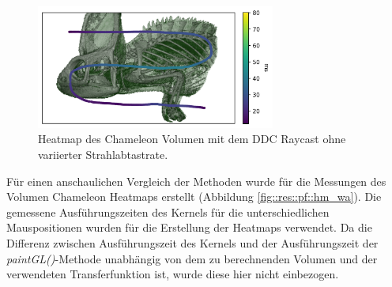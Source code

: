 \begin{figure}
	\centering
	\includegraphics[width=0.7\textwidth]{../../Neue_Messungen/Chameleon/heatmaps/ms_data_ddc_rORS_chameleon_heatmap.png}
	\caption{Heatmap des Chameleon Volumen mit dem DDC Raycast ohne variierter Strahlabtastrate.}
	\label{fig::res::pf::hm_ddc_ors}
\end{figure}
\fi

Für einen anschaulichen Vergleich der Methoden wurde für die Messungen des Volumen Chameleon Heatmaps erstellt (Abbildung \ref{fig::res::pf::hm_wa}).
Die gemessene Ausführungszeiten des Kernels für die unterschiedlichen Mauspositionen wurden für die Erstellung der Heatmaps verwendet.
Da die Differenz zwischen Ausführungszeit des Kernels und der Ausführungszeit der \emph{paintGL()}-Methode unabhängig von dem zu berechnenden Volumen und der verwendeten Transferfunktion ist, wurde diese hier nicht einbezogen.

